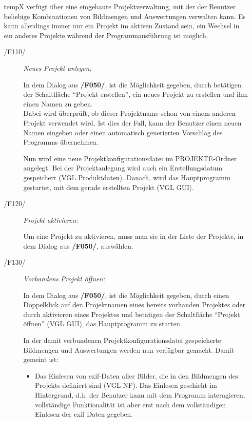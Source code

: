 	\gls{tempX} verfügt über eine eingebaute Projektverwaltung, mit der der Benutzer beliebige Kombinationen von Bildmengen und Auswertungen verwalten kann. Es kann allerdings immer nur ein Projekt im aktiven Zustand sein, ein Wechsel in ein anderes Projekte während der Programmausführung ist möglich.
	
	\begin{description}		
		
		\item[/F110/] \textit{Neues Projekt anlegen:}\par In dem Dialog aus \textbf{/F050/}, ist die Möglichkeit gegeben, durch betätigen der Schaltfläche "`Projekt erstellen"', ein neues Projekt zu erstellen und ihm einen Namen zu geben.\\ Dabei wird überprüft, ob dieser Projektname schon von einem anderen Projekt verwendet wird. Ist dies der Fall, kann der Benutzer einen neuen Namen eingeben oder einen automatisch generierten Vorschlag des Programms übernehmen.\par Nun wird eine neue Projektkonfigurationsdatei im PROJEKTE-Ordner angelegt. Bei der Projektanlegung wird auch ein Erstellungsdatum gespeichert (VGL Produktdaten). Danach, wird das Hauptprogramm gestartet, mit dem gerade erstellten Projekt (VGL GUI).
		
		\item[/F120/] \textit{Projekt aktivieren:}\par Um eine Projekt zu aktivieren, muss man sie in der Liste der Projekte, in dem Dialog aus \textbf{/F050/}, auswählen.
				
		\item[/F130/] \textit{Vorhandens Projekt öffnen:}\par In dem Dialog aus \textbf{/F050/}, ist die Möglichkeit gegeben, durch einen Doppelklick auf den Projektnamen eines bereits vorhanden Projektes oder durch aktivieren eines Projektes und betätigen der Schaltfläche "`Projekt öffnen"' (VGL GUI), das Hauptprogramm zu starten.\par In der damit verbundenen Projektkonfigurationsdatei gespeicherte Bildmengen und Auswertungen werden nun verfügbar gemacht. Damit gemeint ist: 
			
			\begin{itemize}
				
				\item Das Einlesen von \gls{exif}-Daten aller Bilder, die in den Bildmengen des Projekts definiert sind (VGL NF). Das Einlesen geschieht im Hintergrund, d.h. der Benutzer kann mit dem Programm interagieren, vollständige Funktionalität ist aber erst nach dem vollständigen Einlesen der \gls{exif} Daten gegeben.
				

\end{itemize}
\end{description}
